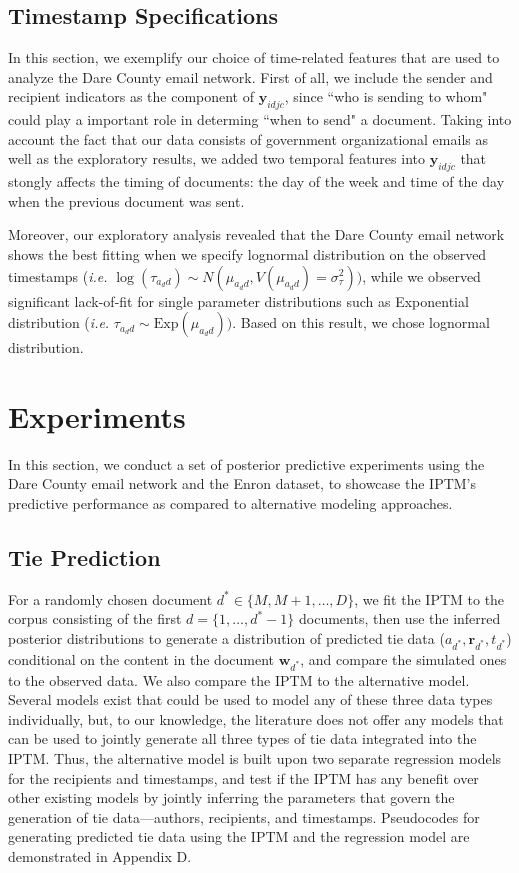 \documentclass[twoside]{article}
\begin{document}
\subsection{Timestamp Specifications}\label{subsec:Timestamp Specifications}
In this section, we exemplify our choice of time-related features that are used to analyze the Dare County email network. First of all, we include the sender and recipient indicators as the component of $\boldsymbol{y}_{idjc}$, since ``who is sending to whom" could play a important role in determing ``when to send" a document. Taking into account the fact that our data consists of government organizational emails as well as the exploratory results, we added two temporal features into $\boldsymbol{y}_{idjc}$ that stongly affects the timing of documents: the day of the week and time of the day when the previous document was sent. 

Moreover, our exploratory analysis revealed that the Dare County email network shows the best fitting when we specify lognormal distribution on the observed timestamps (\textit{i.e.} $\log(\tau_{a_dd}) \sim N(\mu_{a_d d}, V(\mu_{a_d d}) = \sigma^2_\tau))$, while we observed significant lack-of-fit for single parameter distributions such as Exponential distribution (\textit{i.e.} $\tau_{a_dd} \sim \mbox{Exp}(\mu_{a_d d}))$. Based on this result, we chose lognormal distribution. 

\section{Experiments}\label{sec:Experiments}
In this section, we conduct a set of posterior predictive experiments using the Dare County email network and the Enron dataset, to showcase the IPTM's predictive performance as compared to alternative modeling approaches.

\subsection{Tie Prediction}\label{subsec:Tie Prediction}
 For a randomly chosen document $d^* \in \{M, M+1,\ldots, D\}$, we fit the IPTM to the corpus consisting of the first $d = \{1,\hdots,d^*-1\}$ documents, then use the inferred posterior distributions to generate a distribution of predicted tie data ($a_{d^*}, \boldsymbol{r}_{d^*}, t_{d^*}$) conditional on the content in the document $\boldsymbol{w}_{d^*}$, and compare the simulated ones to the observed data. We also compare the IPTM to the alternative model. Several models exist that could be used to model any of these three data types individually, but, to our knowledge, the literature does not offer any models that can be used to jointly generate all three types of tie data integrated into the IPTM. Thus, the alternative model is built upon two separate regression models for the recipients and timestamps, and test if the IPTM has any benefit over other existing models by jointly inferring the parameters that govern the generation of tie data---authors, recipients, and timestamps. Pseudocodes for generating predicted tie data using the IPTM and the regression model are demonstrated in Appendix D.
 
\end{document}
